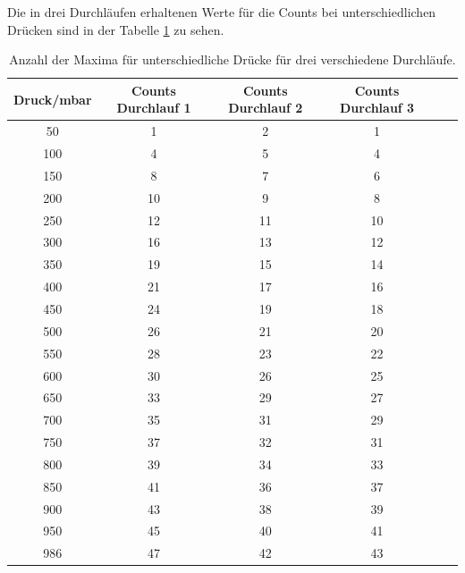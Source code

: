             Die in drei Durchläufen erhaltenen Werte für die Counts bei unterschiedlichen Drücken sind in der 
            Tabelle \ref{tab:luft} zu sehen. 

            \begin{table}
                \centering
                \caption{Anzahl der Maxima für unterschiedliche Drücke für drei verschiedene Durchläufe.}
                \label{tab:luft}
                \begin{tabular}{c c c c c c}
                    \toprule
                    Druck/mbar & Counts Durchlauf 1 & Counts Durchlauf 2 & Counts Durchlauf 3\\
                    \midrule
                        50  & 1  & 2  & 1  \\ 
                        100 & 4  & 5  & 4  \\
                        150 & 8  & 7  & 6  \\
                        200 & 10 & 9  & 8  \\
                        250 & 12 & 11 & 10 \\ 
                        300 & 16 & 13 & 12 \\
                        350 & 19 & 15 & 14 \\
                        400 & 21 & 17 & 16 \\
                        450 & 24 & 19 & 18 \\ 
                        500 & 26 & 21 & 20 \\
                        550 & 28 & 23 & 22 \\ 
                        600 & 30 & 26 & 25 \\
                        650 & 33 & 29 & 27 \\
                        700 & 35 & 31 & 29 \\
                        750 & 37 & 32 & 31 \\
                        800 & 39 & 34 & 33 \\
                        850 & 41 & 36 & 37 \\
                        900 & 43 & 38 & 39 \\
                        950 & 45 & 40 & 41 \\
                        986 & 47 & 42 & 43 \\
                    \bottomrule
                \end{tabular}
            \end{table}



